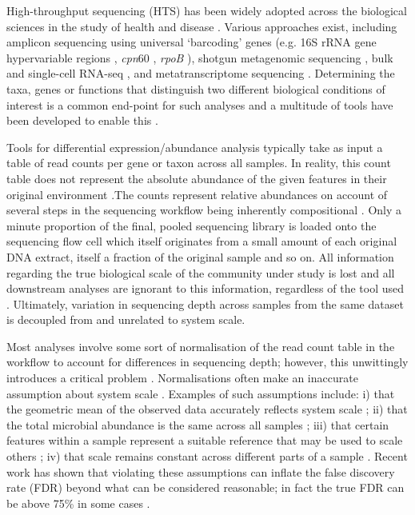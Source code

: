 \documentclass{article}
\begin{document}
High-throughput sequencing (HTS) has been widely adopted across the biological sciences in the study of health and disease \cite{malla_exploring_2019, Montgomery:2022aa}. Various approaches exist, including amplicon sequencing using universal `barcoding' genes (e.g. 16S rRNA gene hypervariable regions \cite{johnson_evaluation_2019}, \textit{cpn}60 \cite{vancuren_variant_2020}, \textit{rpoB} \cite{ogier_rpob_2019}), shotgun metagenomic sequencing \cite{quince_shotgun_2017}, bulk and single-cell RNA-seq \cite{gate_clonally_2020,jovic_single_2022}, and metatranscriptome sequencing \cite{france_insight_2022}. Determining the taxa, genes or functions that distinguish two different biological conditions of interest is a common end-point for such analyses and a multitude of tools have been developed to enable this \cite{Quinn:2019aa, liu_practical_2021}.

Tools for differential expression/abundance analysis typically take as input a table of read counts per gene or taxon across all samples. In reality, this count table does not represent the absolute abundance of the given features in their original environment \cite{gloor_its_2016,vandeputte_quantitative_2017}.The counts represent relative abundances on account of several steps in the sequencing workflow being inherently compositional \cite{gloor_compositional_2016}. Only a minute proportion of the final, pooled sequencing library is loaded onto the sequencing flow cell which itself originates from a small amount of each original DNA extract, itself a fraction of the original sample and so on. All information regarding the true biological scale of the community under study is lost and all downstream analyses are ignorant to this information, regardless of the tool used \cite{lovell_proportions_2011}. Ultimately, variation in sequencing depth across samples from the same dataset is decoupled from and unrelated to system scale.

Most analyses involve some sort of normalisation of the read count table in the workflow to account for differences in sequencing depth; however, this unwittingly introduces a critical problem \cite{weiss_normalization_2017}. Normalisations often make an inaccurate assumption about system scale \cite{nixon_scale_2024, nixon_incorporating_2025, gloor_explicit_2025}. Examples of such assumptions include: i) that the geometric mean of the observed data accurately reflects system scale \cite{aitchison_statistical_1986}; ii) that the total microbial abundance is the same across all samples \cite{hughes_rarefaction_2005}; iii) that certain features within a sample represent a suitable reference that may be used to scale others \cite{robinson_scaling_2010,vandesompele_accurate_2002}; iv) that scale remains constant across different parts of a sample \cite{anders_2010_differential}. Recent work has shown that violating these assumptions can inflate the false discovery rate (FDR) beyond what can be considered reasonable; in fact the true FDR can be above 75\% in some cases \cite{li_exaggerated_2022,konnaris_uncertainty_2025,nixon_incorporating_2025,gloor_explicit_2025}.
\end{document}
